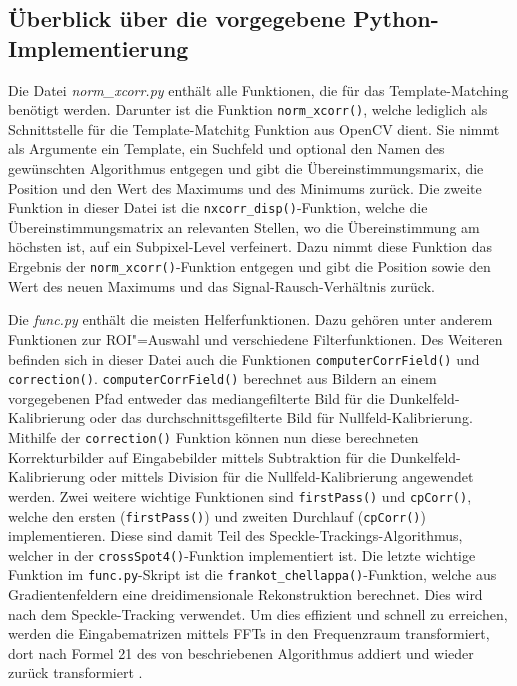 \subsection{Überblick über die vorgegebene Python-Implementierung}

Die Datei \textit{norm\_xcorr.py} enthält alle Funktionen, die für das Template-Matching benötigt werden. Darunter ist die Funktion \texttt{norm\_xcorr()}, welche lediglich als Schnittstelle für die Template-Matchitg Funktion aus OpenCV dient. Sie nimmt als Argumente ein Template, ein Suchfeld und optional den Namen des gewünschten Algorithmus entgegen und gibt die Übereinstimmungsmarix, die Position und den Wert des Maximums und des Minimums zurück. Die zweite Funktion in dieser Datei ist die \texttt{nxcorr\_disp()}-Funktion, welche die Übereinstimmungsmatrix an relevanten Stellen, wo die Übereinstimmung am höchsten ist, auf ein Subpixel-Level verfeinert. Dazu nimmt diese Funktion das Ergebnis der \texttt{norm\_xcorr()}-Funktion entgegen und gibt die Position sowie den Wert des neuen Maximums und das Signal-Rausch-Verhältnis zurück. 

Die \textit{func.py} enthält die meisten Helferfunktionen. Dazu gehören unter anderem Funktionen zur \gls{ROI}"=Auswahl und verschiedene Filterfunktionen. Des Weiteren befinden sich in dieser Datei auch die Funktionen \texttt{computerCorrField()} und \texttt{correction()}.  \texttt{computerCorrField()} berechnet aus Bildern an einem vorgegebenen Pfad entweder das mediangefilterte Bild für die Dunkelfeld-Kalibrierung oder das durchschnittsgefilterte Bild für Nullfeld-Kalibrierung. Mithilfe der \texttt{correction()} Funktion können nun diese berechneten Korrekturbilder auf Eingabebilder mittels Subtraktion für die Dunkelfeld-Kalibrierung oder mittels Division für die Nullfeld-Kalibrierung angewendet werden. Zwei weitere wichtige Funktionen sind \texttt{firstPass()} und \texttt{cpCorr()}, welche den ersten (\texttt{firstPass()}) und zweiten Durchlauf (\texttt{cpCorr()}) implementieren. Diese sind damit Teil des Speckle-Trackings-Algorithmus, welcher in der \texttt{crossSpot4()}-Funktion implementiert ist. Die letzte wichtige Funktion im \texttt{func.py}-Skript ist die \texttt{frankot\_chellappa()}-Funktion, welche aus Gradientenfeldern eine dreidimensionale Rekonstruktion berechnet. Dies wird nach dem Speckle-Tracking verwendet. Um dies effizient und schnell zu erreichen, werden die Eingabematrizen mittels \glspl{FFT} in den Frequenzraum transformiert, dort nach Formel 21 des von \citeauthor{FC88} beschriebenen Algorithmus addiert und wieder zurück transformiert . 

